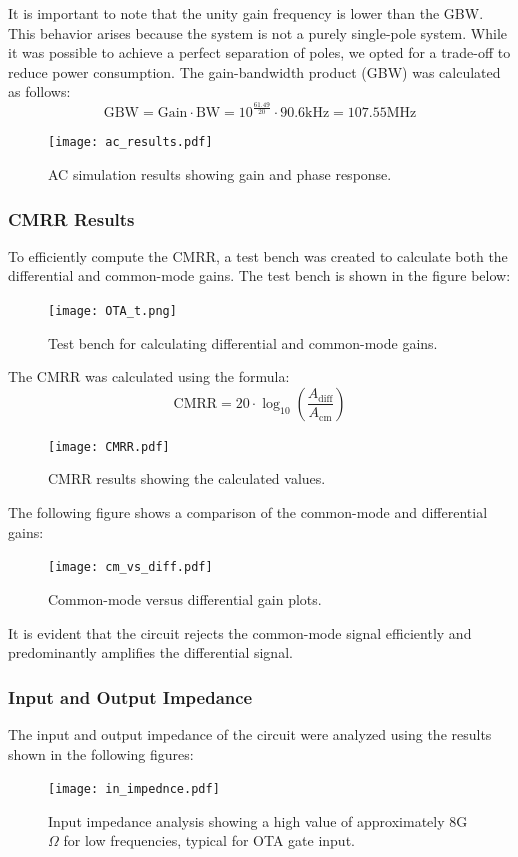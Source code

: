 \documentclass[12pt,a4paper]{article}
\begin{document}
It is important to note that the unity gain frequency is lower than the GBW. This behavior arises because the system is not a purely single-pole system. While it was possible to achieve a perfect separation of poles, we opted for a trade-off to reduce power consumption.
 The gain-bandwidth product (GBW) was calculated as follows:
\begin{equation*}
    \text{GBW} = \text{Gain} \cdot \text{BW} = 10^{\frac{61.49}{20}} \cdot 90.6\text{kHz} = 107.55\text{MHz}
\end{equation*}
\begin{figure}[H]
    \centering
    \texttt{[image: ac\_results.pdf]}
    \caption{AC simulation results showing gain and phase response.}
    \label{fig:ac_results}
\end{figure}
\pagebreak
\subsubsection*{CMRR Results}
To efficiently compute the CMRR, a test bench was created to calculate both the differential and common-mode gains. The test bench is shown in the figure below:

\begin{figure}[H]
    \centering
    \texttt{[image: OTA\_t.png]}
    \caption{Test bench for calculating differential and common-mode gains.}
    \label{fig:ota_test_bench}
\end{figure}

The CMRR was calculated using the formula:
\begin{equation*}
    \text{CMRR} = 20 \cdot \log_{10}\left(\frac{A_{\text{diff}}}{A_{\text{cm}}}\right)
\end{equation*}
\begin{figure}[H]
    \centering
    \texttt{[image: CMRR.pdf]}
    \caption{CMRR results showing the calculated values.}
    \label{fig:cmrr}
\end{figure}
The following figure shows a comparison of the common-mode and differential gains:
\begin{figure}[H]
    \centering
    \texttt{[image: cm\_vs\_diff.pdf]}
    \caption{Common-mode versus differential gain plots.}
    \label{fig:cm_vs_diff}
\end{figure}
It is evident that the circuit rejects the common-mode signal efficiently and predominantly amplifies the differential signal.
\pagebreak
\subsubsection*{Input and Output Impedance}
The input and output impedance of the circuit were analyzed using the results shown in the following figures:
\begin{figure}[H]
    \centering
    \texttt{[image: in\_impednce.pdf]}
    \caption{Input impedance analysis showing a high value of approximately 8G$\Omega$ for low frequencies, typical for OTA gate input.}
    \label{fig:input_impedance}
\end{figure}
\end{document}
